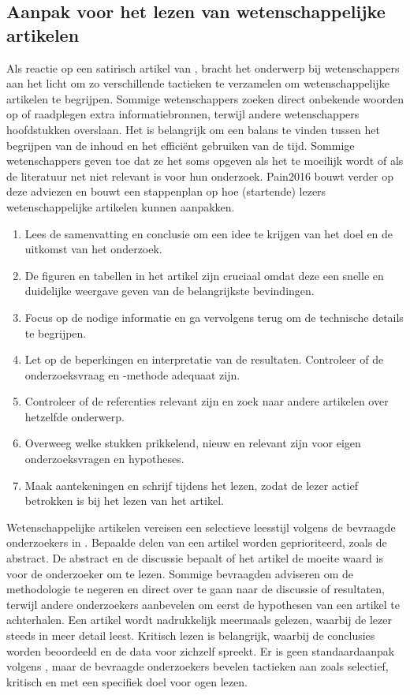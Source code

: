 \subsection{Aanpak voor het lezen van wetenschappelijke artikelen}

Als reactie op een satirisch artikel van \textcite{Ruben2016}, bracht \textcite{Pain2016} het onderwerp bij wetenschappers aan het licht om zo verschillende tactieken te verzamelen om wetenschappelijke artikelen te begrijpen. Sommige wetenschappers zoeken direct onbekende woorden op of raadplegen extra informatiebronnen, terwijl andere wetenschappers hoofdstukken overslaan. Het is belangrijk om een balans te vinden tussen het begrijpen van de inhoud en het efficiënt gebruiken van de tijd. Sommige wetenschappers geven toe dat ze het soms opgeven als het te moeilijk wordt of als de literatuur net niet relevant is voor hun onderzoek. {Pain2016} bouwt verder op deze adviezen en bouwt een stappenplan op hoe (startende) lezers wetenschappelijke artikelen kunnen aanpakken.

\begin{enumerate}
	\item Lees de samenvatting en conclusie om een idee te krijgen van het doel en de uitkomst van het onderzoek.
	\item De figuren en tabellen in het artikel zijn cruciaal omdat deze een snelle en duidelijke weergave geven van de belangrijkste bevindingen.
	\item Focus op de nodige informatie en ga vervolgens terug om de technische details te begrijpen.
	\item Let op de beperkingen en interpretatie van de resultaten. Controleer of de onderzoeksvraag en -methode adequaat zijn.
	\item Controleer of de referenties relevant zijn en zoek naar andere artikelen over hetzelfde onderwerp.
	\item Overweeg welke stukken prikkelend, nieuw en relevant zijn voor eigen onderzoeksvragen en hypotheses.
	\item Maak aantekeningen en schrijf tijdens het lezen, zodat de lezer actief betrokken is bij het lezen van het artikel.
\end{enumerate}

Wetenschappelijke artikelen vereisen een selectieve leesstijl volgens de bevraagde onderzoekers in \textcite{Hubbard2017}. Bepaalde delen van een artikel worden geprioriteerd, zoals de abstract. De abstract en de discussie bepaalt of het artikel de moeite waard is voor de onderzoeker om te lezen. Sommige bevraagden adviseren om de methodologie te negeren en direct over te gaan naar de discussie of resultaten, terwijl andere onderzoekers aanbevelen om eerst de hypothesen van een artikel te achterhalen. Een artikel wordt nadrukkelijk meermaals gelezen, waarbij de lezer steeds in meer detail leest. Kritisch lezen is belangrijk, waarbij de conclusies worden beoordeeld en de data voor zichzelf spreekt. Er is geen standaardaanpak volgens \textcite{Hubbard2017}, maar de bevraagde onderzoekers bevelen tactieken aan zoals selectief, kritisch en met een specifiek doel voor ogen lezen.

